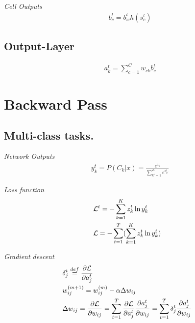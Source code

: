 \documentclass[a4paper,11pt,titlepage,UTF8]{article}
\begin{document}
        \emph{Cell Outputs}
        \begin{align}
        & b_c^t=b_w^th(s_c^t)
        \end{align}

        \subsection{Output-Layer}
        \begin{align}
        & a_k^t=\sum_{c=1}^C w_{ck} b_c^t
        \end{align}

    \section{Backward Pass}
        \subsection{Multi-class tasks.}

        \emph{Network Outputs}
        \begin{align}
        & y_k^t = P(C_k | x) = \frac{e^{a_k^t}}{\sum_{k'=1}^K e^{a_{k'}^t}}
        \end{align}

        \emph{Loss function}
        \begin{align}
        & \mathcal{L}^t=-\sum_{k=1}^K z_k^t \ln y_k^t \notag \\
        & \mathcal{L}=-\sum_{t=1}^T(\sum_{k=1}^K z_k^t \ln y_k^t)
        \end{align}

        \emph{Gradient descent}
        \begin{align}
        & \delta_j^t\stackrel{def}{=} \frac{\partial \mathcal{L}}{\partial a_j^t} \notag \\
        & w_{ij}^{(m+1)}=w_{ij}^{(m)}-\alpha \Delta w_{ij} \\
        & \Delta w_{ij}=\frac{\partial \mathcal{L}}{\partial w_{ij}}
        =\sum_{t=1}^T\frac{\partial \mathcal{L}}{\partial a_j^t}\frac{\partial a_j^t}{\partial w_{ij}}
        =\sum_{t=1}^T\delta_j^t \frac{\partial a_j^t}{\partial w_{ij}}
        \end{align}
\end{document}
